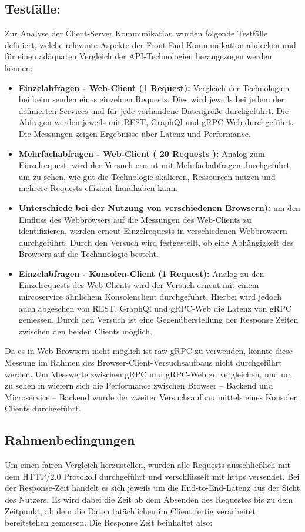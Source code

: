 \subsection*{Testfälle:}
Zur Analyse der Client-Server Kommunikation wurden folgende Testfälle definiert, welche relevante Aspekte der Front-End Kommunikation abdecken und für einen adäquaten Vergleich der API-Technologien herangezogen werden können: 
\begin{itemize}
	\item \textbf{Einzelabfragen - Web-Client (1 Request):} Vergleich der Technologien bei beim senden eines einzelnen Requests. Dies wird jeweils bei jedem der definierten Services und für jede vorhandene Datengröße durchgeführt. Die Abfragen werden jeweils mit REST, GraphQl und gRPC-Web durchgeführt. Die Messungen zeigen Ergebnisse über Latenz und Performance.
	\item \textbf{Mehrfachabfragen - Web-Client ( 20 Requests ):} Analog zum Einzelrequest, wird der Versuch erneut mit Mehrfachabfragen durchgeführt, um zu sehen, wie gut die Technologie skalieren, Ressourcen nutzen und mehrere Requests effizient handhaben kann.  
	\item \textbf{Unterschiede bei der Nutzung von verschiedenen Browsern):} um den Einfluss des Webbrowsers auf die Messungen des Web-Clients zu identifizieren, werden erneut Einzelrequests in verschiedenen Webbrowsern durchgeführt. Durch den Versuch wird festgestellt, ob eine Abhängigkeit des Browsers auf die Technnologie besteht.
	\item \textbf{Einzelabfragen - Konsolen-Client (1 Request):} Analog zu den Einzelrequests des Web-Clients wird der Versuch erneut mit einem mircoservice ähnlichem Konsolenclient durchgeführt. Hierbei wird jedoch auch abgesehen von REST, GraphQl und gRPC-Web die Latenz von gRPC gemessen. Durch den Versuch ist eine Gegenüberstellung der Response Zeiten zwischen den beiden Clients möglich.
\end{itemize}

Da es in Web Browsern nicht möglich ist raw gRPC zu verwenden, konnte diese Messung im Rahmen des Browser-Client-Versuchsaufbaus nicht durchgeführt werden. Um Messwerte zwischen gRPC und gRPC-Web zu vergleichen, und um zu sehen in wiefern sich die Performance zwischen Browser – Backend und Microservice – Backend wurde der zweiter Versuchsaufbau mittels eines Konsolen Clients durchgeführt.

\subsection*{Rahmenbedingungen}
Um einen fairen Vergleich herzustellen, wurden alle Requests ausschließlich mit dem HTTP/2.0 Protokoll durchgeführt und verschlüsselt mit https versendet. Bei der Response-Zeit handelt es sich jeweils um die End-to-End-Latenz aus der Sicht des Nutzers. Es wird dabei die Zeit ab dem Absenden des Requestes bis zu dem Zeitpunkt, ab dem die Daten tatächlichen im Client fertig verarbeitet bereitstehen gemessen. Die Response Zeit beinhaltet also: 

